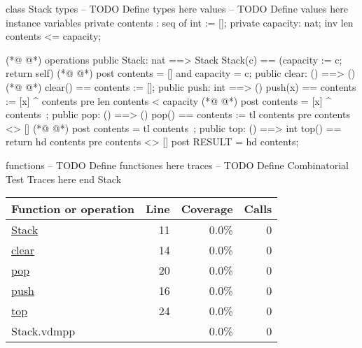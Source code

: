 \begin{vdmpp}[breaklines=true]
class Stack
types
-- TODO Define types here
values
-- TODO Define values here
instance variables
                private contents : seq of int := [];
                private capacity:  nat;
                inv len contents <= capacity;
                
(*@
\label{Stack:11}
@*)
operations
                public Stack: nat ==> Stack
                Stack(c) == (capacity := c; return self)
(*@
\label{clear:14}
@*)
                post contents = [] and capacity = c;
                public clear: () ==> ()
(*@
\label{push:16}
@*)
                clear() == contents := [];
                public push: int ==> ()
                push(x) == contents := [x] ^ contents
                pre len contents < capacity
(*@
\label{pop:20}
@*)
                post contents = [x] ^ contents~;
                public pop: () ==> ()
                pop() == contents := tl contents
                pre contents <> []
(*@
\label{top:24}
@*)
                post contents = tl contents~;
                public top: () ==> int
                top() == return hd contents
                pre contents <> []
                post RESULT = hd contents;
                
functions
-- TODO Define functiones here
traces
-- TODO Define Combinatorial Test Traces here
end Stack
\end{vdmpp}
\bigskip
\begin{longtable}{|l|r|r|r|}
\hline
Function or operation & Line & Coverage & Calls \\
\hline
\hline
\hyperref[Stack:11]{Stack} & 11&0.0\% & 0 \\
\hline
\hyperref[clear:14]{clear} & 14&0.0\% & 0 \\
\hline
\hyperref[pop:20]{pop} & 20&0.0\% & 0 \\
\hline
\hyperref[push:16]{push} & 16&0.0\% & 0 \\
\hline
\hyperref[top:24]{top} & 24&0.0\% & 0 \\
\hline
\hline
Stack.vdmpp & & 0.0\% & 0 \\
\hline
\end{longtable}

